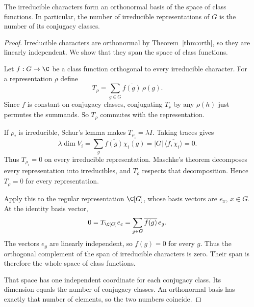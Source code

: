 \begin{theorem}\label{thm:classes}
The irreducible characters form an orthonormal basis of the space of class functions. In particular, the number of irreducible representations of $G$ is the number of its conjugacy classes.
\end{theorem}
\begin{proof}
Irreducible characters are orthonormal by
Theorem~\ref{thm:orth}, so they are
linearly independent. We show that
they span the space of class functions.

Let $f:G\to\C$ be a class function
orthogonal to every irreducible
character. For a representation $\rho$
define
\[
T_\rho=\sum_{g\in G}
\overline{f(g)}\,\rho(g).
\]
Since $f$ is constant on conjugacy
classes, conjugating $T_\rho$
by any $\rho(h)$ just permutes
the summands. So $T_\rho$
commutes with the representation.

If $\rho_i$ is irreducible, Schur's
lemma makes $T_{\rho_i}=\lambda I$.
Taking traces gives
\[
\lambda\dim V_i
=\sum_g\overline{f(g)}\chi_i(g)
=|G|\,\overline{\langle f,\chi_i\rangle}=0.
\]
Thus $T_{\rho_i}=0$ on every
irreducible representation.
Maschke's theorem decomposes
every representation into
irreducibles, and $T_\rho$
respects that decomposition.
Hence $T_\rho=0$ for every
representation.

Apply this to the regular
representation $\C[G]$, whose
basis vectors are $e_x$, $x\in G$.
At the identity basis vector,
\[
0=T_{\C[G]}e_e
=\sum_{g\in G}\overline{f(g)}\,e_g.
\]
The vectors $e_g$ are linearly
independent, so $f(g)=0$
for every $g$. Thus the orthogonal
complement of the span of
irreducible characters is zero.
Their span is therefore the
whole space of class functions.

That space has one independent
coordinate for each conjugacy
class. Its dimension equals the
number of conjugacy classes.
An orthonormal basis has
exactly that number of elements,
so the two numbers coincide.
\end{proof}

